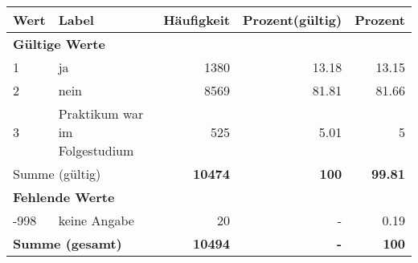      \begin{longtable}{lXrrr}
     \toprule
     \textbf{Wert} & \textbf{Label} & \textbf{Häufigkeit} & \textbf{Prozent(gültig)} & \textbf{Prozent} \\
     \endhead
     \midrule
     \multicolumn{5}{l}{\textbf{Gültige Werte}}\\

     1 &
     \multicolumn{1}{X}{ ja   } &


       \num{1380} &
       \num[round-mode=places,round-precision=2]{13,18} &
         \num[round-mode=places,round-precision=2]{13,15} \\

     2 &
     \multicolumn{1}{X}{ nein   } &


       \num{8569} &
       \num[round-mode=places,round-precision=2]{81,81} &
         \num[round-mode=places,round-precision=2]{81,66} \\

     3 &
     \multicolumn{1}{X}{ Praktikum war im Folgestudium   } &


       \num{525} &
       \num[round-mode=places,round-precision=2]{5,01} &
         \num[round-mode=places,round-precision=2]{5} \\
     \midrule
     \multicolumn{2}{l}{Summe (gültig)} &
       \textbf{\num{10474}} &
     \textbf{100} &
       \textbf{\num[round-mode=places,round-precision=2]{99,81}} \\
     \multicolumn{5}{l}{\textbf{Fehlende Werte}}\\
       -998 &
       keine Angabe &
         \num{20} &
        - &
         \num[round-mode=places,round-precision=2]{0,19} \\
     \midrule
     \multicolumn{2}{l}{\textbf{Summe (gesamt)}} &
          \textbf{\num{10494}} &
        \textbf{-} &
        \textbf{100} \\
     \bottomrule
     \end{longtable}
     
